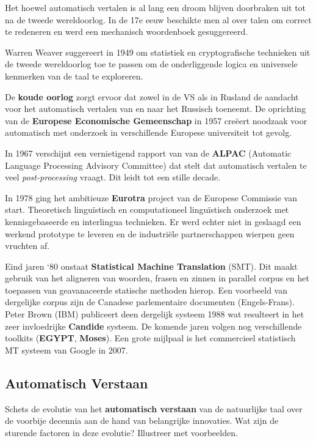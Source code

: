 \documentclass[../main.tex]{subfiles}
\begin{document}
\begin{solution}
	\item Het hoewel automatisch vertalen is al lang een droom blijven doorbraken uit tot na de tweede wereldoorlog. In de 17e eeuw beschikte men al over talen om correct te redeneren en werd een mechanisch woordenboek gesuggereerd.
	\item Warren Weaver suggereert in 1949 om statistiek en cryptografische technieken uit de tweede wereldoorlog toe te passen om de onderliggende logica en universele kenmerken van de taal te exploreren.
	\item De \textbf{koude oorlog} zorgt ervoor dat zowel in de VS als in Rusland de aandacht voor het automatisch vertalen van en naar het Russisch toeneemt. De oprichting van de \textbf{Europese Economische Gemeenschap} in 1957 creëert noodzaak voor automatisch met onderzoek in verschillende Europese universiteit tot gevolg.
	\item In 1967 verschijnt een vernietigend rapport van van de \textbf{ALPAC} (Automatic Language Processing Advisory Committee) dat stelt dat automatisch vertalen te veel \emph{post-processing} vraagt. Dit leidt tot een stille decade.
	\item In 1978 ging het ambitieuze \textbf{Eurotra} project van de Europese Commissie van start. Theoretisch lingu\"istisch en computationeel lingu\"istisch onderzoek met kennisgebaseerde en interlingua technieken. Er werd echter niet in geslaagd een werkend prototype te leveren en de industri\"ele partnerschappen wierpen geen vruchten af.
	\item Eind jaren `80 onstaat \textbf{Statistical Machine Translation} (SMT). Dit maakt gebruik van het aligneren van woorden, frasen en zinnen in parallel corpus en het toepassen van geavanaceerde statische methoden hierop. Een voorbeeld van dergelijke corpus zijn de Canadese parlementaire documenten (Engels-Frans). Peter Brown (IBM) publiceert deen dergelijk systeem 1988 wat resulteert in het zeer invloedrijke \textbf{Candide} systeem. De komende jaren volgen nog verschillende toolkits (\textbf{EGYPT}, \textbf{Moses}). Een grote mijlpaal is het commercieel statistisch MT systeem van Google in 2007.
\end{solution}

\subsection{Automatisch Verstaan}
\begin{question}
Schets de evolutie van het \textbf{automatisch verstaan} van de natuurlijke taal over de voorbije decennia aan de hand van belangrijke innovaties.
Wat zijn de sturende factoren in deze evolutie?
Illustreer met voorbeelden.
\end{question}
\end{document}

